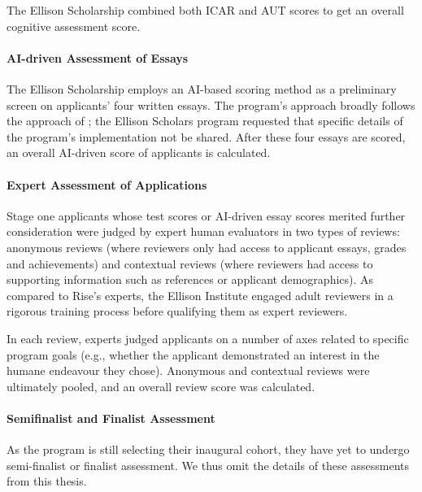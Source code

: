 The Ellison Scholarship combined both ICAR and AUT scores to get an overall cognitive assessment score.

\paragraph{AI-driven Assessment of Essays}
The Ellison Scholarship employs an AI-based scoring method as a preliminary screen on applicants' four written essays. The program's approach broadly follows the approach of \textcite{xiao2024humanaicollaborativeessayscoring}; the Ellison Scholars program requested that specific details of the program's implementation not be shared. After these four essays are scored, an overall AI-driven score of applicants is calculated.

\paragraph{Expert Assessment of Applications}
Stage one applicants whose test scores or AI-driven essay scores merited further consideration were judged by expert human evaluators in two types of reviews: anonymous reviews (where reviewers only had access to applicant essays, grades and achievements) and contextual reviews (where reviewers had access to supporting information such as references or applicant demographics). As compared to Rise's experts, the Ellison Institute engaged adult reviewers in a rigorous training process before qualifying them as expert reviewers.

In each review, experts judged applicants on a number of axes related to specific program goals (e.g., whether the applicant demonstrated an interest in the humane endeavour they chose). Anonymous and contextual reviews were ultimately pooled, and an overall review score was calculated.

\paragraph{Semifinalist and Finalist Assessment}
As the program is still selecting their inaugural cohort, they have yet to undergo semi-finalist or finalist assessment. We thus omit the details of these assessments from this thesis.